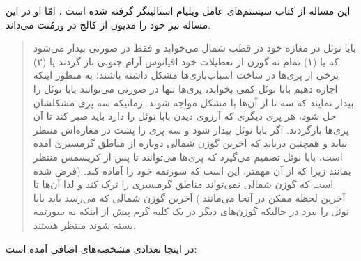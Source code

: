 \documentclass{book}
\begin{document}
    این مساله از کتاب سیستم‌های عامل ویلیام استالینگز گرفته شده است  \cite{stallings}، امّا او در این مساله نیز خود را مدیون 
    از کالج   در ورمُنت می‌داند. 


\begin{quotation}
    بابا نوئل در مغازه خود در قطب شمال می‌خوابد و فقط در صورتی بیدار می‌شود که یا (۱) تمام نه گوزن از تعطیلات خود اقیانوس آرام جنوبی باز گردند یا (۲)
    برخی از پری‌ها در ساخت اسباب‌بازی‌ها مشکل داشته باشند؛ به منظور اینکه اجازه دهیم بابا نوئل کمی بخوابد، پری‌ها تنها در صورتی می‌توانند 
    بابا نوئل را بیدار نمایند که سه تا از آن‌ها با مشکل مواجه شوند. زمانیکه سه پری مشکلشان حل شود،‌ هر پری دیگری که آرزوی دیدن بابا نوئل را دارد 
    باید صبر کند تا آن پری‌ها بازگردند. اگر بابا نوئل بیدار شود و سه پری را پشت در مغازه‌اش منتظر بیابد و همچنین دریابد که آخرین گوزن شمالی دوباره  از مناطق 
    گرمسیری آمده است، بابا نوئل تصمیم می‌گیرد که پری‌ها می‌توانند تا پس از کریسمس منتظر بمانند زیرا که از آن مهمتر، این است که سورتمه خود را آماده کند. 
    (فرض شده است که گوزن شمالی نمی‌تواند مناطق گرمسیری را ترک کند و لذا آن‌ها تا آخرین لحظه ممکن در آنجا می‌مانند.)
    آخرین گوزن شمالی که می‌رسد باید بابا نوئل را ببرد در حالیکه گوزن‌های دیگر در یک کلبه گرم پیش از اینکه به سورتمه بسته شوند منتظر هستند. 
\end{quotation}

    در اینجا تعدادی مشخصه‌های اضافی آمده است: 
\end{document}
